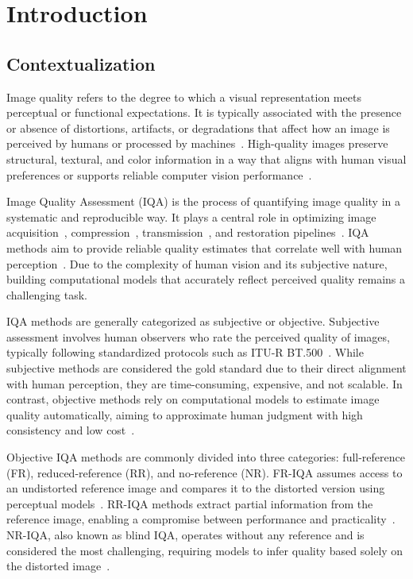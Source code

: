\chapter{Introduction}\label{chap:introduction}

\section{Contextualization}\label{sec:contextualization}

Image quality refers to the degree to which a visual representation meets perceptual or functional expectations. It is typically associated with the presence or absence of distortions, artifacts, or degradations that affect how an image is perceived by humans or processed by machines~\cite{wang_bovik_modern_iqa_2006, thung_survey_iqa, ComprehensiveEvaluation2019}. High-quality images preserve structural, textural, and color information in a way that aligns with human visual preferences or supports reliable computer vision performance~\cite{sheikh_vif_2006, zhang_lpips_2018}.

Image Quality Assessment (IQA) is the process of quantifying image quality in a systematic and reproducible way. It plays a central role in optimizing image acquisition~\cite{ciancio_blur_assessment_2011}, compression~\cite{wang_no_reference_jpeg_2002}, transmission~\cite{engelke_wireless_iqa_2010}, and restoration pipelines~\cite{dabov_bm3d_2007}. IQA methods aim to provide reliable quality estimates that correlate well with human perception~\cite{wang_ssim_2004, FullReference2024}. Due to the complexity of human vision and its subjective nature, building computational models that accurately reflect perceived quality remains a challenging task.

IQA methods are generally categorized as subjective or objective. Subjective assessment involves human observers who rate the perceived quality of images, typically following standardized protocols such as ITU-R BT.500~\cite{itu_bt500_2023}. While subjective methods are considered the gold standard due to their direct alignment with human perception, they are time-consuming, expensive, and not scalable. In contrast, objective methods rely on computational models to estimate image quality automatically, aiming to approximate human judgment with high consistency and low cost~\cite{zaric_comparison_objective_subjective, sheikh_vif_2006}.

Objective IQA methods are commonly divided into three categories: full-reference (FR), reduced-reference (RR), and no-reference (NR). FR-IQA assumes access to an undistorted reference image and compares it to the distorted version using perceptual models~\cite{wang_ssim_2004, sheikh_ifc_2005, zhang_fsim_2011}. RR-IQA methods extract partial information from the reference image, enabling a compromise between performance and practicality~\cite{wang_wavelet_statistics_2005, li_divisive_normalization_2009}. NR-IQA, also known as blind IQA, operates without any reference and is considered the most challenging, requiring models to infer quality based solely on the distorted image~\cite{mittal_brisque_2012, bosse_deep_nriqa_2018}.


